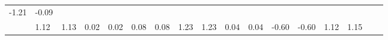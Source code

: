 \documentclass[
]{book}
\begin{document}
\begin{longtable}[]{@{}lllllllllllllllll@{}}
\begin{minipage}[t]{0.04\columnwidth}
-1.21\strut
\end{minipage} & \begin{minipage}[t]{0.03\columnwidth}\raggedright
-0.09\strut
\end{minipage}\tabularnewline
\begin{minipage}[t]{0.03\columnwidth}\raggedright
\strut
\end{minipage} & \begin{minipage}[t]{0.04\columnwidth}\raggedright
1.12\strut
\end{minipage} & \begin{minipage}[t]{0.03\columnwidth}\raggedright
1.13\strut
\end{minipage} & \begin{minipage}[t]{0.04\columnwidth}\raggedright
0.02\strut
\end{minipage} & \begin{minipage}[t]{0.03\columnwidth}\raggedright
0.02\strut
\end{minipage} & \begin{minipage}[t]{0.05\columnwidth}\raggedright
0.08\strut
\end{minipage} & \begin{minipage}[t]{0.03\columnwidth}\raggedright
0.08\strut
\end{minipage} & \begin{minipage}[t]{0.03\columnwidth}\raggedright
1.23\strut
\end{minipage} & \begin{minipage}[t]{0.03\columnwidth}\raggedright
1.23\strut
\end{minipage} & \begin{minipage}[t]{0.05\columnwidth}\raggedright
0.04\strut
\end{minipage} & \begin{minipage}[t]{0.03\columnwidth}\raggedright
0.04\strut
\end{minipage} & \begin{minipage}[t]{0.03\columnwidth}\raggedright
-0.60\strut
\end{minipage} & \begin{minipage}[t]{0.03\columnwidth}\raggedright
-0.60\strut
\end{minipage} & \begin{minipage}[t]{0.04\columnwidth}\raggedright
1.12\strut
\end{minipage} & \begin{minipage}[t]{0.03\columnwidth}\raggedright
1.15\strut
\end{minipage} & \begin{minipage}[t]{0.04\columnwidth}\raggedright

\end{minipage}
\end{longtable}
\end{document}
